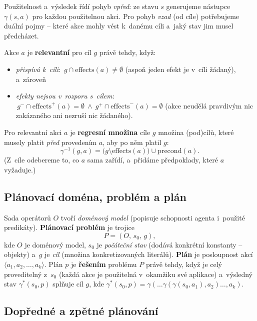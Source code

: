 Použitelnost a~výsledek řídí pohyb \emph{vpřed}: ze stavu $s$ generujeme nástupce $\gamma(s,a)$ pro každou použitelnou akci. Pro pohyb \emph{vzad} (od cíle) potřebujeme duální pojmy -- které akce mohly vést k~danému cíli a~jaký stav jim musel předcházet.

\begin{definice}
Akce $a$ je \textbf{relevantní} pro cíl $g$ právě tehdy, když:
\begin{itemize}
  \item \emph{přispívá k~cíli}: $\,g\cap \mathrm{effects}(a)\neq\emptyset$ (aspoň jeden efekt je v~cíli žádaný), a~zároveň
  \item \emph{efekty nejsou v~rozporu s~cílem}: $\,g^{-}\cap \mathrm{effects}^{+}(a)=\emptyset \ \wedge\ g^{+}\cap \mathrm{effects}^{-}(a)=\emptyset$ (akce neudělá pravdivým nic zakázaného ani nezruší nic žádaného).
\end{itemize}
Pro relevantní akci $a$ je \textbf{regresní množina} cíle $g$ množina (pod)cílů, které musely platit \emph{před} provedením $a$, aby po něm platil $g$:
\[ \gamma^{-1}(g,a) = \bigl(g\setminus \mathrm{effects}(a)\bigr)\cup \mathrm{precond}(a). \]
(Z~cíle odebereme to, co $a$ sama zařídí, a~přidáme předpoklady, které $a$ vyžaduje.)
\end{definice}

\subsection{Plánovací doména, problém a plán}

\begin{definice}
Sada operátorů $O$ tvoří \emph{doménový model} (popisuje schopnosti agenta i~použité predikáty). \textbf{Plánovací problém} je trojice
\[ P=(O,\,s_0,\,g), \]
kde $O$ je doménový model, $s_0$ je \emph{počáteční stav} (dodává konkrétní konstanty -- objekty) a~$g$ je \emph{cíl} (množina konkretizovaných literálů). \textbf{Plán} je posloupnost akcí $\langle a_1,a_2,\dots,a_k\rangle$. Plán $p$ je \textbf{řešením} problému $P$ právě tehdy, když je celý proveditelný z~$s_0$ (každá akce je použitelná v~okamžiku své aplikace) a~výsledný stav $\gamma^{*}(s_0,p)$ splňuje cíl $g$, kde $\gamma^{*}(s_0,p)=\gamma(\dots\gamma(\gamma(s_0,a_1),a_2)\dots,a_k)$.
\end{definice}

\subsection{Dopředné a zpětné plánování}

